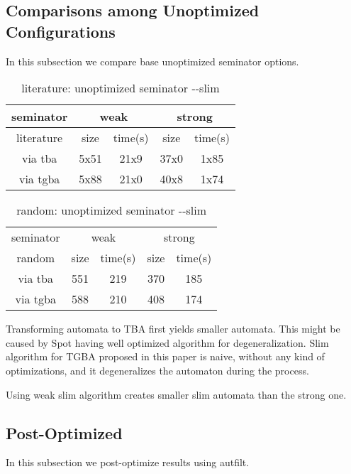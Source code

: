 \documentclass[
	digital
nolof, nolot
]{fithesis3}
\begin{document}
	\subsection{Comparisons among Unoptimized Configurations}
	In this subsection we compare base unoptimized seminator options.
\begin{table}[ht]
	\centering
	\caption{literature: unoptimized seminator -\/-slim}
		\begin{tabular}{ |c||c|c|c|c| } 
			\hline
			seminator&\multicolumn{2}{c|}{weak}&\multicolumn{2}{c|}{strong} \\
			\hline
			literature&size&time(s)&size&time(s)\\
			\hhline{|=====|}
			
			via tba&5x51&21x9& 37x0 &1x85\\
			\hline
			via tgba&5x88&21x0& 40x8&1x74\\ 
			\hline
		\end{tabular}
\end{table}
	
	
	\begin{table}[ht]
		\centering
		\caption{random: unoptimized seminator -\/-slim}
		\begin{tabular}{ |c||c|c|c|c| } 
			\hline
			seminator&\multicolumn{2}{c|}{weak}&\multicolumn{2}{c|}{strong} \\
			\hhline{|=====|}
			random&size&time(s)&size&time(s)\\
			\hline
			via tba&551&219& 370 &185\\
			\hline
			via tgba&588&210& 408&174\\ 
			\hline
		\end{tabular}
\end{table}
	
	
	Transforming automata to TBA first yields smaller automata. This might be caused by Spot having well optimized algorithm for degeneralization. Slim algorithm for TGBA proposed in this paper is naive, without any kind of optimizations, and it degeneralizes the automaton during the process.
	
	Using weak slim algorithm creates smaller slim automata than the strong one. 

	\subsection{Post-Optimized}
	In this subsection we post-optimize results using autfilt.
	
\end{document}
